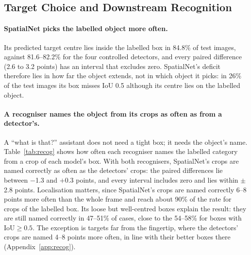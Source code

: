 \subsection{Target Choice and Downstream Recognition}\label{sec:choice}

\paragraph{SpatialNet picks the labelled object more often.} Its predicted target centre lies inside the labelled box in 84.8\% of test images, against 81.6--82.2\% for the four controlled detectors, and every paired difference (2.6 to 3.2 points) has an interval that excludes zero. SpatialNet's deficit therefore lies in how far the object extends, not in which object it picks: in 26\% of the test images its box misses IoU 0.5 although its centre lies on the labelled object.

\paragraph{A recogniser names the object from its crops as often as from a detector's.} A ``what is that?'' assistant does not need a tight box; it needs the object's name. Table~\ref{tab:recog} shows how often each recogniser names the labelled category from a crop of each model's box. With both recognisers, SpatialNet's crops are named correctly as often as the detectors' crops: the paired differences lie between $-$1.3 and $+$0.3 points, and every interval includes zero and lies within $\pm$2.8 points. Localisation matters, since SpatialNet's crops are named correctly 6--8 points more often than the whole frame and reach about 90\% of the rate for crops of the labelled box. Its loose but well-centred boxes explain the result: they are still named correctly in 47--51\% of cases, close to the 54--58\% for boxes with IoU${\geq}0.5$. The exception is targets far from the fingertip, where the detectors' crops are named 4--8 points more often, in line with their better boxes there (Appendix~\ref{app:recog}).


